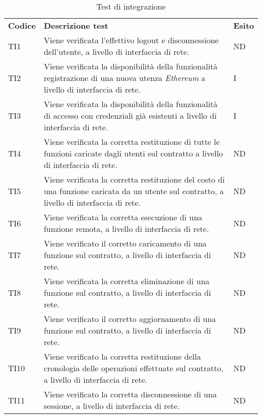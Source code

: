 \begin{longtable}{|C{1.5cm}|C{10cm}|C{1.5cm}|}
	
	\caption{Test di integrazione}\\
	\hline
	
	\textbf{Codice} & \textbf{Descrizione test}  & \textbf{Esito}
	\tabularnewline
	\endfirsthead
	TI1 &
	Viene verificata l'effettivo logout e disconnessione dell'utente, a livello di interfaccia di rete.  &
	ND \\
	
	TI2 &
	Viene verificata la disponibilità della funzionalità registrazione di una nuova utenza \textit{Ethereum\glo} a livello di interfaccia di rete.  &
	I \\
	
	TI3 &
	Viene verificata la disponibilità della funzionalità di accesso con credenziali già esistenti a livello di interfaccia di rete.  &
	I \\
	
	TI4 &
	Viene verificata la corretta restituzione di tutte le funzioni caricate dagli utenti sul contratto a livello di interfaccia di rete.  &
	ND \\
	
	TI5 &
	Viene verificata la corretta restituzione del costo di una funzione caricata da un utente sul contratto, a livello di interfaccia di rete.  &
	ND \\
	
	TI6 &
	Viene verificata la corretta esecuzione di una funzione remota, a livello di interfaccia di rete.  &
	ND \\
	
	TI7 &
	Viene verificato il corretto caricamento di una funzione sul contratto, a livello di interfaccia di rete.  &
	ND \\
	
	TI8 &
	Viene verificata la corretta eliminazione di una funzione sul contratto, a livello di interfaccia di rete.  &
	ND \\
	
	TI9 &
	Viene verificato il corretto aggiornamento di una funzione sul contratto, a livello di interfaccia di rete.  &
	ND \\
	
	TI10 &
	Viene verificato la corretta restituzione della cronologia delle operazioni effettuate sul contratto, a livello di interfaccia di rete.  &
	ND \\
	
	TI11 &
	Viene verificato la corretta disconnessione di una sessione, a livello di interfaccia di rete.  &
	ND \\
	

\end{longtable}
